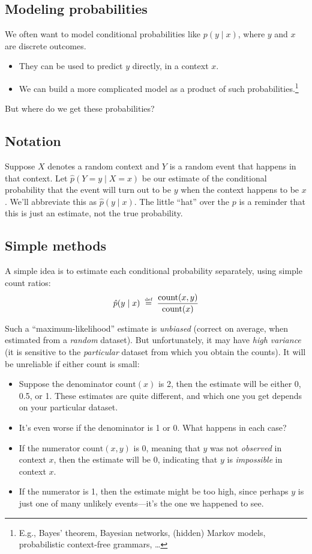 \documentclass[11pt]{article}
\newcommand{\defeq}{\;\stackrel{\mbox{\tiny def}}{=}\;}
\newcommand{\ph}{\hat{p}}
\begin{document}
\subsection{Modeling probabilities}

We often want to model conditional probabilities like $p(y
\mid x)$, where $y$ and $x$ are discrete outcomes.
\begin{itemize}[noitemsep]
\item They can be used to predict $y$ directly, in a context $x$.
\item We can build a more complicated model as a product
  of such probabilities.\footnote{E.g., Bayes' theorem, Bayesian
    networks, (hidden) Markov models, probabilistic context-free
    grammars, \ldots}
\end{itemize}
But where do we get these probabilities?

\subsection{Notation}

Suppose $X$ denotes a random context and $Y$ is a random event that
happens in that context.  Let $\ph(Y=y \mid X=x)$ be our estimate of
the conditional probability that the event will turn out to be $y$ when
the context happens to be $x$.  We'll abbreviate this as
$\ph(y\mid x)$.  The little ``hat'' over the $p$ is a reminder that
this is just an estimate, not the true probability.

\subsection{Simple methods}\label{sec:mle}

A simple idea is to estimate each conditional probability separately,
using simple count ratios: 
\begin{equation}
\ph(y \mid x) \defeq \frac{\textrm{count}(x,y)}{\textrm{count}(x)}
\end{equation}

Such a ``maximum-likelihood'' estimate is {\em unbiased} (correct on
average, when estimated from a {\em random} dataset).  But unfortunately, it
may have {\em high variance} (it is sensitive to the {\em particular}
dataset from which you obtain the counts).  It will be unreliable if
either count is small:
\begin{itemize}[noitemsep]
\item Suppose the denominator $\textrm{count}(x)$ is 2, then the estimate
  will be either 0, 0.5, or 1.  These estimates are quite different,
  and which one you get depends on your particular dataset.  
\item It's even worse if the denominator is 1 or 0.  What happens in
  each case?
\item If the numerator $\textrm{count}(x,y)$ is 0, meaning that $y$
  was not {\em observed} in context $x$, then the estimate will
  be 0, indicating that $y$ is {\em impossible} in context $x$.  
\item If the numerator is 1, then the estimate might be too high,
  since perhaps $y$ is just one of many unlikely events---it's the one
  we happened to see.
\end{itemize}
\end{document}
